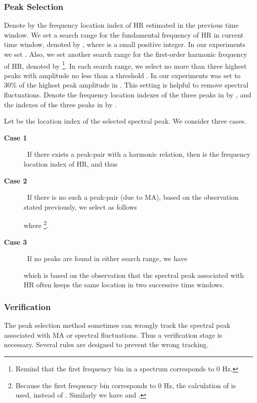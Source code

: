 \documentclass[10pt,twocolumn]{IEEEtran}
\begin{document}
\subsubsection{Peak Selection}
\label{subsubsec:peakSelection}

Denote by  the frequency location index of HR estimated in the previous time window. We set a search range for the fundamental frequency of HR in current time window, denoted by , where  is a small positive integer. In our experiments we set . Also, we set another search range for the first-order harmonic frequency of HR, denoted by  \footnote{Remind that the first frequency bin in a spectrum corresponds to 0 Hz.}. In each search range, we select no more than three highest peaks with amplitude no less than a threshold . In our experiments  was set to 30\% of the highest peak amplitude in . This setting is helpful to remove spectral fluctuations. Denote the frequency location indexes of the three peaks in  by , and the indexes of the three peaks in  by .

Let  be the location index of the selected spectral peak. We consider three cases.
\begin{description}
  \item[\textbf{Case 1} ] ~If there exists a peak-pair  with a harmonic relation, then  is the  frequency location index of HR, and thus


  \item[\textbf{Case 2} ] ~If there is no such a peak-pair (due to MA), based on the observation stated previously, we select  as follows

where  \footnote{Because the first frequency bin corresponds to 0 Hz, the calculation of  is used, instead of . Similarly we have  and .}.


  \item[\textbf{Case 3} ] ~If no peaks are found in either search range, we have

  which is based on the observation that the spectral peak associated with HR often keeps the same location in two successive time windows.
\end{description}






\subsubsection{Verification}

The peak selection method sometimes can wrongly track the spectral peak associated with MA or spectral fluctuations. Thus a verification stage is necessary. Several rules are designed to prevent the wrong tracking.
\end{document}
